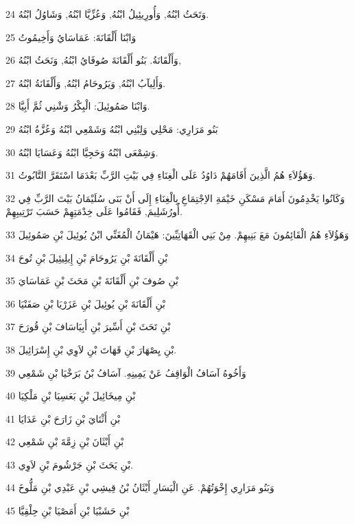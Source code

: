 \par 24 وَتَحَثُ ابْنُهُ, وَأُورِيئِيلُ ابْنُهُ, وَعُزِّيَّا ابْنُهُ, وَشَاوُلُ ابْنُهُ.
\par 25 وَابْنَا أَلْقَانَةَ: عَمَاسَايُ وَأَخِيمُوتُ
\par 26 وَأَلْقَانَةُ. بَنُو أَلْقَانَةَ صُوفَايُ ابْنُهُ, وَنَحَثُ ابْنُهُ,
\par 27 وَأَلِيآبُ ابْنُهُ, وَيَرُوحَامُ ابْنُهُ, وَأَلْقَانَةُ ابْنُهُ.
\par 28 وَابْنَا صَمُوئِيلَ: الْبِكْرُ وَشْنِي ثُمَّ أَبِيَّا.
\par 29 بَنُو مَرَارِي: مَحْلِي وَلِبْنِي ابْنُهُ وَشَمْعِي ابْنُهُ وَعُزَّةُ ابْنُهُ
\par 30 وَشِمْعَى ابْنُهُ وَحَجِيَّا ابْنُهُ وَعَسَايَا ابْنُهُ.
\par 31 وَهَؤُلاَءِ هُمُ الَّذِينَ أَقَامَهُمْ دَاوُدُ عَلَى الْغِنَاءِ فِي بَيْتِ الرَّبِّ بَعْدَمَا اسْتَقَرَّ التَّابُوتُ.
\par 32 وَكَانُوا يَخْدِمُونَ أَمَامَ مَسْكَنِ خَيْمَةِ الاِجْتِمَاعِ بِالْغِنَاءِ إِلَى أَنْ بَنَى سُلَيْمَانُ بَيْتَ الرَّبِّ فِي أُورُشَلِيمَ, فَقَامُوا عَلَى خِدْمَتِهِمْ حَسَبَ تَرْتِيبِهِمْ.
\par 33 وَهَؤُلاَءِ هُمُ الْقَائِمُونَ مَعَ بَنِيهِمْ. مِنْ بَنِي الْقَهَاتِيِّينَ: هَيْمَانُ الْمُغَنِّي ابْنُ يُوئِيلَ بْنِ صَمُوئِيلَ
\par 34 بْنِ أَلْقَانَةَ بْنِ يَرُوحَامَ بْنِ إِيلِيئِيلَ بْنِ تُوحَ
\par 35 بْنِ صُوفَ بْنِ أَلْقَانَةَ بْنِ مَحَثَ بْنِ عَمَاسَايَ
\par 36 بْنِ أَلْقَانَةَ بْنِ يُوئِيلَ بْنِ عَزَرْيَا بْنِ صَفَنْيَا
\par 37 بْنِ تَحَثَ بْنِ أَسِّيرَ بْنِ أَبِيَاسَافَ بْنِ قُورَحَ
\par 38 بْنِ يِصْهَارَ بْنِ قَهَاتَ بْنِ لاَوِي بْنِ إِسْرَائِيلَ.
\par 39 وَأَخُوهُ آسَافُ الْوَاقِفُ عَنْ يَمِينِهِ. آسَافُ بْنُ بَرَخْيَا بْنِ شَمْعِي
\par 40 بْنِ مِيخَائِيلَ بْنِ بَعَسِيَا بْنِ مَلْكِيَا
\par 41 بْنِ أَثْنَايَ بْنِ زَارَحَ بْنِ عَدَايَا
\par 42 بْنِ أَيْثَانَ بْنِ زِمَّةَ بْنِ شَمْعِي
\par 43 بْنِ يَحَثَ بْنِ جَرْشُومَ بْنِ لاَوِي.
\par 44 وَبَنُو مَرَارِي إِخْوَتُهُمْ. عَنِ الْيَسَارِ أَيْثَانُ بْنُ قِيشِي بْنِ عَبْدِي بْنِ مَلُّوخَ
\par 45 بْنِ حَشَبْيَا بْنِ أَمَصْيَا بْنِ حِلْقِيَّا
